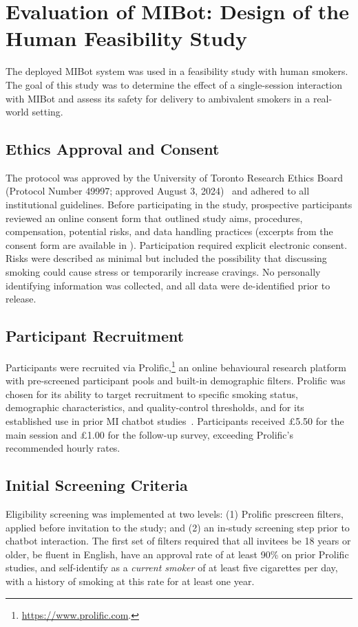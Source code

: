 \chapter{Evaluation of MIBot: Design of the Human Feasibility Study}
\label{ch:mibot-feasibility-study}
The deployed MIBot system was used in a feasibility study with human smokers. The goal of this study was to determine the effect of a single-session interaction with MIBot and assess its safety for delivery to ambivalent smokers in a real-world setting.

\section{Ethics Approval and Consent}
The protocol was approved by the University of Toronto Research Ethics Board (Protocol Number 49997; approved August 3, 2024)~\citep{rose2025ethics} and adhered to all institutional guidelines. Before participating in the study, prospective participants reviewed an online consent form that outlined study aims, procedures, compensation, potential risks, and data handling practices (excerpts from the consent form are available in ). Participation required explicit electronic consent. Risks were described as minimal but included the possibility that discussing smoking could cause stress or temporarily increase cravings. No personally identifying information was collected, and all data were de-identified prior to release.

\section{Participant Recruitment}
\label{sec:recruitment}
Participants were recruited via Prolific,\footnote{\url{https://www.prolific.com}.} an online behavioural research platform with pre-screened participant pools and built-in demographic filters. Prolific was chosen for its ability to target recruitment to specific smoking status, demographic characteristics, and quality-control thresholds, and for its established use in prior MI chatbot studies~\citep{brown2023mi,info:doi/10.2196/20251}. Participants received \pounds5.50 for the main session and \pounds1.00 for the follow-up survey, exceeding Prolific's recommended hourly rates.


\section{Initial Screening Criteria}
Eligibility screening was implemented at two levels: (1) Prolific prescreen filters, applied before invitation to the study; and (2) an in-study screening step prior to chatbot interaction. The first set of filters required that all invitees be 18 years or older, be fluent in English, have an approval rate of at least 90\% on prior Prolific studies, and self-identify as a \emph{current smoker} of at least five cigarettes per day, with a history of smoking at this rate for at least one year.

